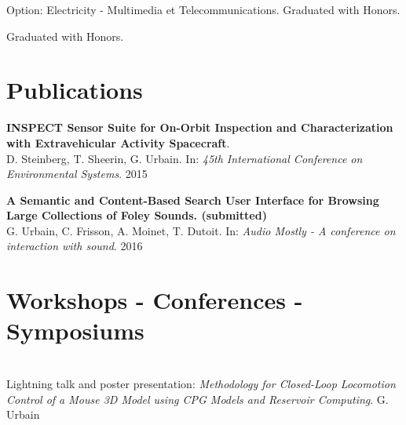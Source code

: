 \documentclass[a4paper]{deedy-resume} %
\begin{document}
\vspace{10pt}

\vspace{2pt}
Option: Electricity - Multimedia et Telecommunications.
Graduated with Honors.

\vspace{3pt}
Graduated with Honors.

\sectionspace %


\section{Publications}
\vspace{5pt}
\textbf{INSPECT Sensor Suite for On-Orbit Inspection and Characterization with Extravehicular Activity Spacecraft}.\\
D. Steinberg, T. Sheerin, G. Urbain. In: \textit{45th International Conference on Environmental Systems}. 2015

\vspace{5pt}
\textbf{A Semantic and Content-Based Search User Interface for Browsing Large Collections of Foley Sounds. (submitted)}\\
G. Urbain, C. Frisson, A. Moinet, T. Dutoit. In: \textit{Audio Mostly - A conference on interaction with sound}. 2016

\sectionspace %
\vspace{5pt}

\section{Workshops - Conferences - Symposiums}
\vspace{5pt}
\\
Lightning talk and poster presentation: \textit{Methodology for Closed-Loop Locomotion Control of a Mouse 3D Model using CPG Models and Reservoir Computing}. G. Urbain
\end{document}
